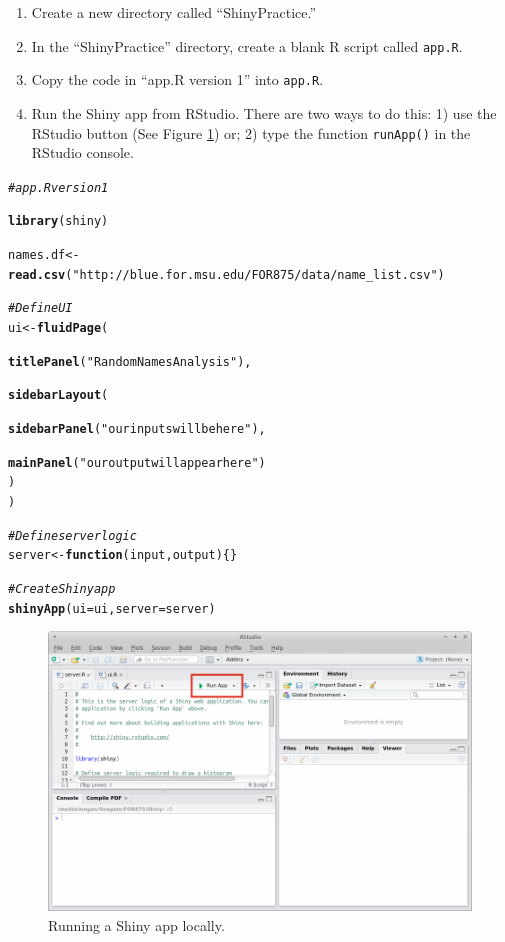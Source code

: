 \documentclass[12pt,oneside]{book}\usepackage[]{graphicx}\usepackage[]{color}
\makeatletter
\newcommand{\hlstr}[1]{\textcolor[rgb]{0.192,0.494,0.8}{#1}}%
\newcommand{\hlcom}[1]{\textcolor[rgb]{0.678,0.584,0.686}{\textit{#1}}}%
\newcommand{\hlstd}[1]{\textcolor[rgb]{0.345,0.345,0.345}{#1}}%
\newcommand{\hlkwa}[1]{\textcolor[rgb]{0.161,0.373,0.58}{\textbf{#1}}}%
\newcommand{\hlkwb}[1]{\textcolor[rgb]{0.69,0.353,0.396}{#1}}%
\newcommand{\hlkwc}[1]{\textcolor[rgb]{0.333,0.667,0.333}{#1}}%
\newcommand{\hlkwd}[1]{\textcolor[rgb]{0.737,0.353,0.396}{\textbf{#1}}}%
\newenvironment{kframe}{%
 \def\at@end@of@kframe{}%
 \ifinner\ifhmode%
  \def\at@end@of@kframe{\end{minipage}}%
  \begin{minipage}{\columnwidth}%
 \fi\fi%
 \def\FrameCommand##1{\hskip\@totalleftmargin \hskip-\fboxsep
 \colorbox{shadecolor}{##1}\hskip-\fboxsep
     \hskip-\linewidth \hskip-\@totalleftmargin \hskip\columnwidth}%
 \MakeFramed {\advance\hsize-\width
   \@totalleftmargin\z@ \linewidth\hsize
   \@setminipage}}%
 {\par\unskip\endMakeFramed%
 \at@end@of@kframe}
\newenvironment{knitrout}{}{} %
\makeatother
\begin{document}
\begin{enumerate}
\item Create a new directory called ``ShinyPractice.''
\item In the ``ShinyPractice'' directory, create a blank R script called \verb+app.R+. 
\item Copy the code in ``app.R version 1'' into \verb+app.R+.
\item Run the Shiny app from RStudio. There are two ways to do this: 1) use the RStudio button (See Figure \ref{fig:fig1}) or; 2) type the function \verb+runApp()+ in the RStudio console.
\end{enumerate}

\begin{knitrout}
\color{fgcolor}\begin{kframe}
\begin{alltt}
\hlcom{# app.R version 1}

\hlkwd{library}\hlstd{(shiny)}

\hlstd{names.df} \hlkwb{<-} \hlkwd{read.csv}\hlstd{(}\hlstr{"http://blue.for.msu.edu/FOR875/data/name_list.csv"}\hlstd{)}

\hlcom{# Define UI}
\hlstd{ui} \hlkwb{<-} \hlkwd{fluidPage}\hlstd{(}

  \hlkwd{titlePanel}\hlstd{(}\hlstr{"Random Names Analysis"}\hlstd{),}

  \hlkwd{sidebarLayout}\hlstd{(}

    \hlkwd{sidebarPanel}\hlstd{(}\hlstr{"our inputs will be here"}\hlstd{),}

    \hlkwd{mainPanel}\hlstd{(}\hlstr{"our output will appear here"}\hlstd{)}
  \hlstd{)}
\hlstd{)}

\hlcom{# Define server logic}
\hlstd{server} \hlkwb{<-} \hlkwa{function}\hlstd{(}\hlkwc{input}\hlstd{,} \hlkwc{output}\hlstd{) \{\}}

\hlcom{# Create Shiny app}
\hlkwd{shinyApp}\hlstd{(}\hlkwc{ui} \hlstd{= ui,} \hlkwc{server} \hlstd{= server)}
\end{alltt}
\end{kframe}
\end{knitrout}

\begin{figure}[H]
\includegraphics[width=5.5in]{09-shiny/09-images/RStudio_runApp.png}
\centering
\caption{Running a Shiny app locally.}
\label{fig:fig1}
\end{figure}
\end{document}
